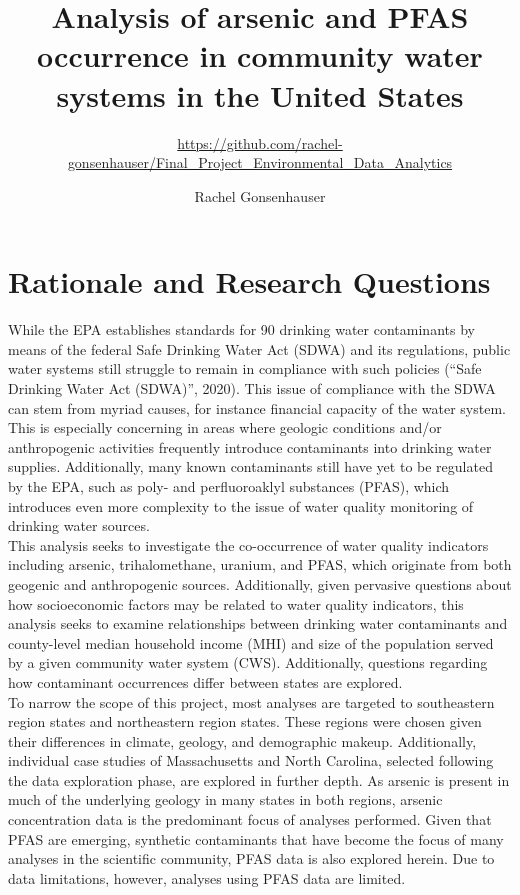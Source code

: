 \documentclass[12pt,]{article}
\title{Analysis of arsenic and PFAS occurrence in community water systems in
the United States}
\subtitle{\url{https://github.com/rachel-gonsenhauser/Final_Project_Environmental_Data_Analytics}}
\author{Rachel Gonsenhauser}
\date{}
\begin{document}
\maketitle

\newpage
\tableofcontents 
\newpage
\listoftables
\newpage
\listoffigures 
\newpage

\hypertarget{rationale-and-research-questions}{%
\section{Rationale and Research
Questions}\label{rationale-and-research-questions}}

While the EPA establishes standards for 90 drinking water contaminants
by means of the federal Safe Drinking Water Act (SDWA) and its
regulations, public water systems still struggle to remain in compliance
with such policies (``Safe Drinking Water Act (SDWA)'', 2020). This
issue of compliance with the SDWA can stem from myriad causes, for
instance financial capacity of the water system. This is especially
concerning in areas where geologic conditions and/or anthropogenic
activities frequently introduce contaminants into drinking water
supplies. Additionally, many known contaminants still have yet to be
regulated by the EPA, such as poly- and perfluoroaklyl substances
(PFAS), which introduces even more complexity to the issue of water
quality monitoring of drinking water sources.\\
This analysis seeks to investigate the co-occurrence of water quality
indicators including arsenic, trihalomethane, uranium, and PFAS, which
originate from both geogenic and anthropogenic sources. Additionally,
given pervasive questions about how socioeconomic factors may be related
to water quality indicators, this analysis seeks to examine
relationships between drinking water contaminants and county-level
median household income (MHI) and size of the population served by a
given community water system (CWS). Additionally, questions regarding
how contaminant occurrences differ between states are explored.\\
To narrow the scope of this project, most analyses are targeted to
southeastern region states and northeastern region states. These regions
were chosen given their differences in climate, geology, and demographic
makeup. Additionally, individual case studies of Massachusetts and North
Carolina, selected following the data exploration phase, are explored in
further depth. As arsenic is present in much of the underlying geology
in many states in both regions, arsenic concentration data is the
predominant focus of analyses performed. Given that PFAS are emerging,
synthetic contaminants that have become the focus of many analyses in
the scientific community, PFAS data is also explored herein. Due to data
limitations, however, analyses using PFAS data are limited.
\end{document}
